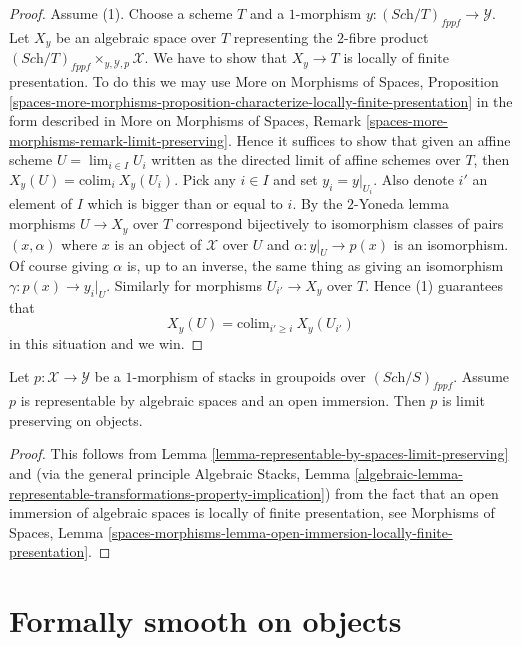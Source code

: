 \begin{proof}
\medskip\noindent
Assume (1). Choose a scheme $T$ and a $1$-morphism
$y : (\textit{Sch}/T)_{fppf} \to \mathcal{Y}$. Let
$X_y$ be an algebraic space over $T$ representing the $2$-fibre product
$(\textit{Sch}/T)_{fppf} \times_{y, \mathcal{Y}, p} \mathcal{X}$.
We have to show that $X_y \to T$ is locally of finite presentation.
To do this we may use
More on Morphisms of Spaces, Proposition
\ref{spaces-more-morphisms-proposition-characterize-locally-finite-presentation}
in the form described in
More on Morphisms of Spaces,
Remark \ref{spaces-more-morphisms-remark-limit-preserving}.
Hence it suffices to show that given an affine scheme
$U = \lim_{i \in I} U_i$ written as the directed limit of affine schemes
over $T$, then $X_y(U) = \text{colim}_i\ X_y(U_i)$.
Pick any $i \in I$ and set $y_i = y|_{U_i}$. Also denote $i'$ an element
of $I$ which is bigger than or equal to $i$. By the $2$-Yoneda lemma
morphisms $U \to X_y$ over $T$ correspond bijectively
to isomorphism classes of pairs $(x, \alpha)$ where $x$ is an object
of $\mathcal{X}$ over $U$ and $\alpha : y|_U \to p(x)$ is an isomorphism.
Of course giving $\alpha$ is, up to an inverse, the same thing as giving
an isomorphism $\gamma : p(x) \to y_i|_U$.
Similarly for morphisms $U_{i'} \to X_y$ over $T$. Hence (1) guarantees
that
$$
X_y(U) = \text{colim}_{i' \geq i}\ X_y(U_{i'})
$$
in this situation and we win.
\end{proof}

\begin{lemma}
\label{lemma-open-immersion-limit-preserving}
Let $p : \mathcal{X} \to \mathcal{Y}$ be a $1$-morphism of stacks in groupoids
over $(\textit{Sch}/S)_{fppf}$. Assume $p$ is representable by algebraic
spaces and an open immersion. Then $p$ is limit preserving on objects.
\end{lemma}

\begin{proof}
This follows from
Lemma \ref{lemma-representable-by-spaces-limit-preserving}
and (via the general principle
Algebraic Stacks, Lemma
\ref{algebraic-lemma-representable-transformations-property-implication})
from the fact that an open immersion of algebraic spaces is
locally of finite presentation, see
Morphisms of Spaces, Lemma
\ref{spaces-morphisms-lemma-open-immersion-locally-finite-presentation}.
\end{proof}



\section{Formally smooth on objects}
\label{section-formally-smooth}

